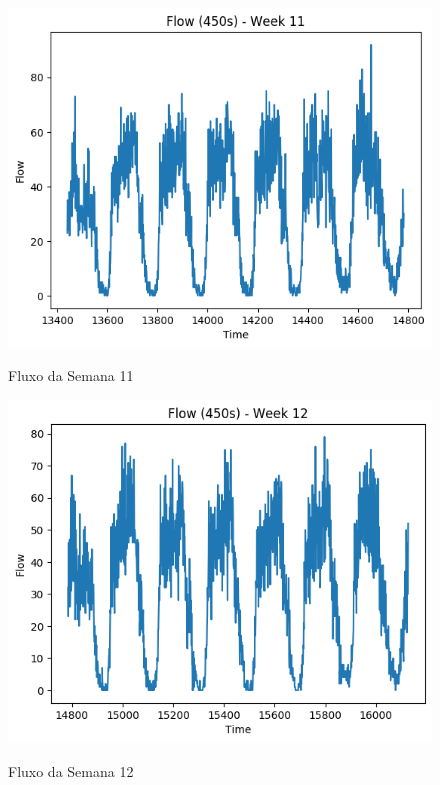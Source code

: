 \begin{figure}[h]
    \centering
    \includegraphics[scale=0.9]{monography/img/flows/flow_450_week_11.png}
    \label{figure:flow_450_week_11}
    \caption{Fluxo da Semana 11}
\end{figure}

\begin{figure}[h]
    \centering
    \includegraphics[scale=0.9]{monography/img/flows/flow_450_week_12.png}
    \label{figure:flow_450_week_12}
    \caption{Fluxo da Semana 12}
\end{figure}

